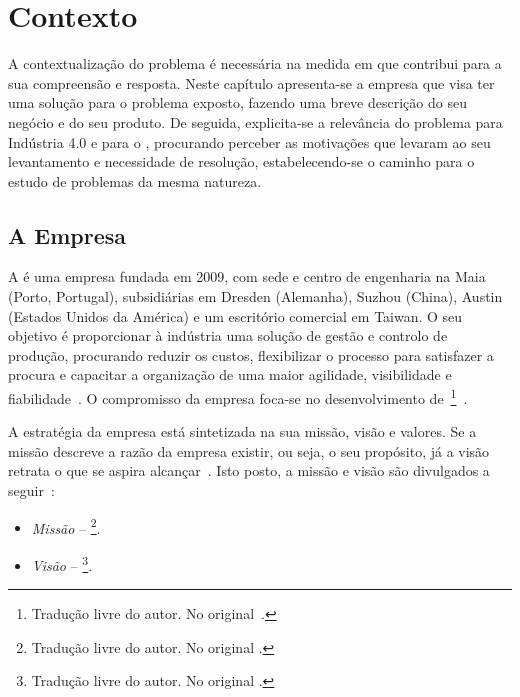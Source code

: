 \chapter{Contexto}
\label{chap:Chapter2}
A contextualização do problema é necessária na medida em que contribui para a sua compreensão e resposta. Neste capítulo apresenta-se a empresa que visa ter uma solução para o problema exposto, fazendo uma breve descrição do seu negócio e do seu produto. De seguida, explicita-se a relevância do problema para Indústria 4.0 e para o {\productname}, procurando perceber as motivações que levaram ao seu levantamento e necessidade de resolução, estabelecendo-se o caminho para o estudo de problemas da mesma natureza.

\section{A Empresa}
\label{sec:chap02_company}
A {\companyname} é uma empresa fundada em 2009, com sede e centro de engenharia na Maia (Porto, Portugal), subsidiárias em Dresden (Alemanha), Suzhou (China), Austin (Estados Unidos da América) e um escritório comercial em Taiwan. O seu objetivo é proporcionar à indústria uma solução de gestão e controlo de produção, procurando reduzir os custos, flexibilizar o processo para satisfazer a procura e capacitar a organização de uma maior agilidade, visibilidade e fiabilidade~\parencite{cmf_overview}. O compromisso da empresa foca-se no desenvolvimento de~\footnote{Tradução livre do autor. No original~.}~\parencite{cmf_overview}.

A estratégia da empresa está sintetizada na sua missão, visão e valores. Se a missão descreve a razão da empresa existir, ou seja, o seu propósito, já a visão retrata o que se aspira alcançar~\parencite[pp.~65-66]{mission_vision_values_what_do_they_say}. Isto posto, a missão e visão são divulgados a seguir~\parencite{cmf_strategy}: 

\begin{itemize}
    \item 
    {
        \textit{Missão} -- \footnote{Tradução livre do autor. No original .}.
    }
    \item 
    {
        \textit{Visão} -- \footnote{Tradução livre do autor. No original .}.
    }
\end{itemize}

